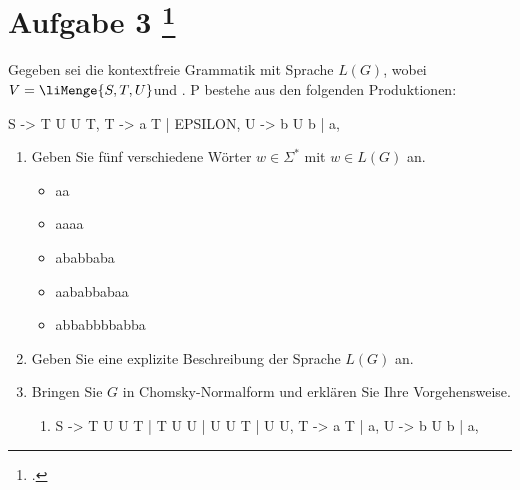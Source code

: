 \documentclass{lehramt-informatik-aufgabe}
\begin{document}
\let\schrittE=\liChomskyUeberErklaerung

\section{Aufgabe 3
\footcite{66115:2019:09}}

Gegeben sei die kontextfreie Grammatik \liGrammatik{} mit Sprache $L(G)$,
wobei $V = \liMenge{S,T,U} $und . P bestehe aus den folgenden
Produktionen:

\begin{liProduktionsRegeln}
S -> T U U T,
T -> a T | EPSILON,
U -> b U b | a,
\end{liProduktionsRegeln}
\begin{enumerate}


\item Geben Sie fünf verschiedene Wörter $w \in \Sigma^*$ mit $w \in
L(G)$ an.

\begin{liAntwort}
\begin{itemize}
\item aa
\item aaaa
\item ababbaba
\item aababbabaa
\item abbabbbbabba
\end{itemize}
\end{liAntwort}


\item Geben Sie eine explizite Beschreibung der Sprache $L(G)$ an.

\begin{liAntwort}
\end{liAntwort}


\item Bringen Sie $G$ in Chomsky-Normalform und erklären Sie Ihre
Vorgehensweise.

\begin{liAntwort}
\begin{enumerate}
\item \schrittE{1}

\begin{liProduktionsRegeln}
S -> T U U T | T U U | U U T | U U,
T -> a T | a,
U -> b U b | a,
\end{liProduktionsRegeln}


\end{enumerate}
\end{liAntwort}
\end{enumerate}
\end{document}
